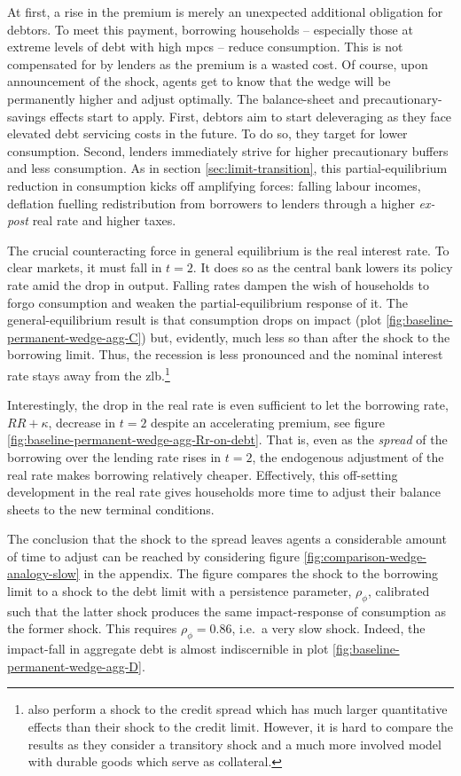 \documentclass[a4paper,12pt]{article} %
\numberwithin{equation}{section} %
\numberwithin{figure}{section}
\numberwithin{table}{section}
\begin{document}
At first, a rise in the premium is merely an unexpected additional obligation for debtors. To meet this payment, borrowing households -- especially those at extreme levels of debt with high \Gls{mpc}s -- reduce consumption. This is not compensated for by lenders as the premium is a wasted cost. Of course, upon announcement of the shock, agents get to know that the wedge will be permanently higher and adjust optimally. The balance-sheet and precautionary-savings effects start to apply. First, debtors aim to start deleveraging as they face elevated debt servicing costs in the future. To do so, they target for lower consumption. Second, lenders immediately strive for higher precautionary buffers and less consumption. As in section \ref{sec:limit-transition}, this partial-equilibrium reduction in consumption kicks off amplifying forces: falling labour incomes, deflation fuelling redistribution from borrowers to lenders through a higher \textit{ex-post} real rate and higher taxes. 

The crucial counteracting force in general equilibrium is the real interest rate. To clear markets, it must fall in $t=2$. It does so as the central bank lowers its policy rate amid the drop in output. Falling rates dampen the wish of households to forgo consumption and weaken the partial-equilibrium response of it. The general-equilibrium result is that consumption drops on impact (plot \ref{fig:baseline-permanent-wedge-agg-C}) but, evidently, much less so than after the shock to the borrowing limit. Thus, the recession is less pronounced and the nominal interest rate stays away from the \Gls{zlb}.\footnote{\textcite{gl2017} also perform a shock to the credit spread which has much larger quantitative effects than their shock to the credit limit. However, it is hard to compare the results as they consider a transitory shock and a much more involved model with durable goods which serve as collateral.} 

Interestingly, the drop in the real rate is even sufficient to let the borrowing rate, $RR + \kappa$, decrease in $t=2$ despite an accelerating premium, see figure \ref{fig:baseline-permanent-wedge-agg-Rr-on-debt}. That is, even as the \textit{spread} of the borrowing over the lending rate rises in $t=2$, the endogenous adjustment of the real rate makes borrowing relatively cheaper. Effectively, this off-setting development in the real rate gives households more time to adjust their balance sheets to the new terminal conditions. 

The conclusion that the shock to the spread leaves agents a considerable amount of time to adjust can be reached by considering figure \ref{fig:comparison-wedge-analogy-slow} in the appendix. The figure compares the shock to the borrowing limit to a shock to the debt limit with a persistence parameter, $\rho_{\phi}$, calibrated such that the latter shock produces the same impact-response of consumption as the former shock. This requires $\rho_{\phi} = 0.86$, i.e.~a very slow shock. Indeed, the impact-fall in aggregate debt is almost indiscernible in plot \ref{fig:baseline-permanent-wedge-agg-D}. 
\end{document}
